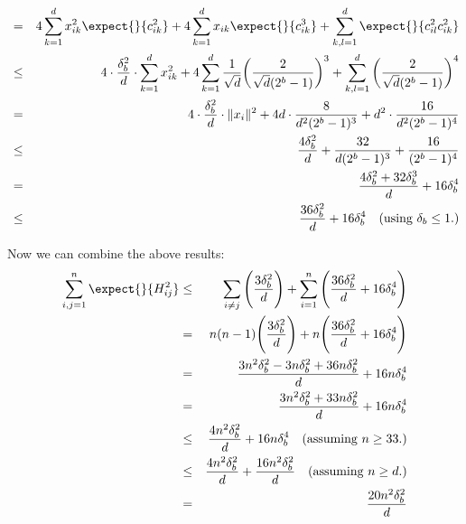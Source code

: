 \begin{enumerate}
\begin{eqnarray*}
	&=& 4 \sum_{k=1}^d x_{ik}^2 \expect{}{c_{ik}^2}  + 4 \sum_{k=1}^d x_{ik} \expect{}{c_{ik}^3}  + \sum_{k,l=1}^d \expect{}{c_{il}^2 c_{ik}^2} \\
	&\leq& 4\cdot \frac{\delta_b^2}{d}\cdot \sum_{k=1}^d x_{ik}^2  + 4 \sum_{k=1}^d \frac{1}{\sqrt{d}} \bigg(\frac{2}{\sqrt{d}(2^b-1)}\bigg)^3  + \sum_{k,l=1}^d \bigg(\frac{2}{\sqrt{d}(2^b-1)}\bigg)^4 \\
	&=& 4\cdot \frac{\delta_b^2}{d}\cdot \|x_i\|^2  + 4 d\cdot \frac{8}{d^2(2^b-1)^3}  + d^2 \cdot \frac{16}{d^2(2^b-1)^4} \\
	&\leq&  \frac{4\delta_b^2}{d}  + \frac{32}{d(2^b-1)^3}  + \frac{16}{(2^b-1)^4} \\
	&=& \frac{4\delta_b^2 + 32\delta_b^3}{d} + 16 \delta_b^4 \\
	&\leq& \frac{36\delta_b^2}{d} + 16 \delta_b^4  \quad \text{(using $\delta_b \leq 1$.)} \\
\end{eqnarray*}
\end{enumerate}
Now we can combine the above results:
\begin{eqnarray*}
	\sum_{i,j=1}^n \expect{}{H_{ij}^2} &\leq& \sum_{i \neq j} \Bigg(\frac{3\delta_b^2}{d} \Bigg) 
	+ \sum_{i=1}^n \Bigg(\frac{36\delta_b^2}{d} + 16 \delta_b^4\Bigg) \\
	&=& n(n-1)\Bigg(\frac{3\delta_b^2}{d} \Bigg) 
	+ n\Bigg(\frac{36\delta_b^2}{d} + 16 \delta_b^4\Bigg) \\
	&=& \frac{3n^2\delta_b^2 - 3n \delta_b^2 + 36 n \delta_b^2}{d} + 16n \delta_b^4 \\
	&=& \frac{3n^2\delta_b^2 + 33 n \delta_b^2}{d} + 16n \delta_b^4 \\
	&\leq& \frac{4n^2\delta_b^2}{d} + 16n \delta_b^4  \quad \text{(assuming $n\geq 33$.)}\\
	&\leq& \frac{4n^2\delta_b^2}{d} + \frac{16n^2\delta_b^2}{d}  \quad \text{(assuming $n\geq d$.)}\\
	&=& \frac{20n^2\delta_b^2}{d}\\
\end{eqnarray*}


